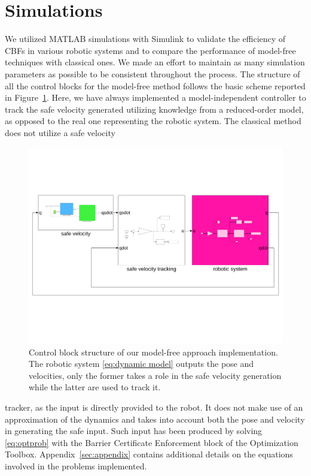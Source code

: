 \section{Simulations}\label{sec:simulation}
We utilized MATLAB simulations with Simulink to validate the efficiency of CBFs in various robotic systems and to compare the performance of model-free techniques with classical ones. We made an effort to maintain as many simulation parameters as possible to be consistent throughout the process. The structure of all the control blocks for the model-free method follows the basic scheme reported in Figure~\ref{fig:simulink}. Here, we have always implemented a model-independent controller to track the safe velocity generated utilizing knowledge from a reduced-order model, as opposed to the real one representing the robotic system. The classical method does not utilize a safe velocity
\begin{figure}[!b]
    \centering
    \includegraphics[width=\linewidth,trim={0 5cm 0 5cm},clip]{../figures/schema.pdf}
    \caption{Control block structure of our model-free approach implementation. The robotic system \eqref{eq:dynamic model} outputs the pose and velocities, only the former takes a role in the safe velocity generation while the latter are used to track it.}
    \label{fig:simulink}
\end{figure}
\noindent
tracker, as the input is directly provided to the robot. It does not make use of an approximation of the dynamics and takes into account both the pose and velocity in generating the safe input. 
Such input has been produced by solving \eqref{eq:optprob} with the Barrier Certificate Enforcement block of the Optimization Toolbox. Appendix~\ref{sec:appendix} contains additional details on the equations involved in the problems implemented.

